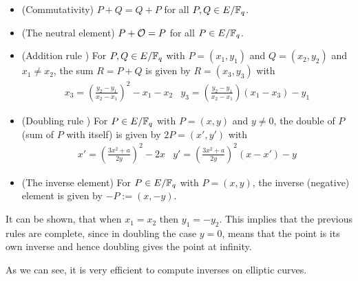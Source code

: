 \begin{itemize}
\item (Commutativity) $P + Q = Q + P$ for all $P,Q \in E/\mathbb{F}_q$.
\item (The neutral element) $P + \mathcal{O} = P$ for all $P \in E/\mathbb{F}_q$.
\item (Addition rule )  For $P, Q \in E/\mathbb{F}_q$ with $P=(x_1,y_1)$ and $Q=(x_2,y_2)$ and $x_1 \neq x_2$, the sum $R=P+Q$ is given by $R=(x_3,y_3)$ with
$$
\begin{array}{lr}
x_3 = \left(\frac{y_2-y_1}{x_2-x_1}\right)^2 -x_1-x_2 &
y_3 = \left(\frac{y_2-y_1}{x_2-x_1} \right)\left(x_1-x_3\right) - y_1
\end{array} 
$$
\item (Doubling rule ) For $P \in E/\mathbb{F}_q$ with $P=(x,y)$ and $y\neq 0$, the double of $P$ (sum of $P$ with itself) is given by $2P=(x',y')$ with
$$
\begin{array}{lr}
x' = \left(\frac{3x^2+a}{2y}\right)^2 -2x &
y' = \left(\frac{3x^2+a}{2y}\right)^2\left(x-x'\right) - y
\end{array} 
$$
\item (The inverse element) For $P \in E/\mathbb{F}_q$ with $P=(x,y)$, the inverse (negative) element is given by $-P:= (x,-y)$.
\end{itemize}  
It can be shown, that when $x_1=x_2$ then $y_1 = -y_2$. This implies that the previous rules are complete, since in doubling the case $y=0$, means that the point is its own inverse and hence doubling gives the point at infinity.

As we can see, it is very efficient to compute inverses on elliptic curves.

